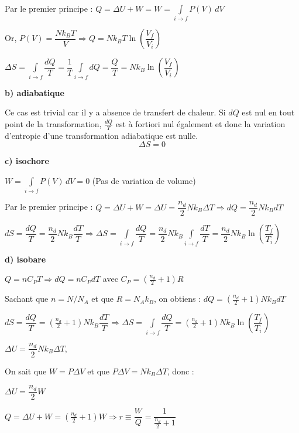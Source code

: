 \documentclass	[11pt, a4paper, openany]{book}
\begin{document}
		Par le premier principe : $ Q = \Delta U + W = W = \int  \limits_{i \to f} P(V)\,dV$
		
		Or, $ P(V) = \dfrac{Nk_BT}{V} \Rightarrow Q = Nk_BT\ln \left(\dfrac{V_f}{V_i}\right)$
		
		$ \Delta S = \int \limits_{i \to f} \dfrac{dQ}{T} = \dfrac{1}{T} \int \limits_{i \to f} dQ = \dfrac{Q}{T} = Nk_B\ln \left(\dfrac{V_f}{V_i}\right)$
	
	\textbf{b) adiabatique}
		
		Ce cas est trivial car il y a absence de transfert de chaleur. Si $dQ$ est nul en tout point de la transformation, $\frac{dQ}{T}$ est à fortiori nul également et donc la variation d'entropie d'une transformation adiabatique est nulle. $$\Delta S = 0$$
		
	\textbf{c) isochore}
	
		$W = \int  \limits_{i \to f} P(V)\,dV = 0$ (Pas de variation de volume)
		
		Par le premier principe : $ Q = \Delta U + W = \Delta U = \dfrac{n_d}{2}Nk_B\Delta T \Rightarrow dQ = \dfrac{n_d}{2}Nk_BdT $
		
		$ dS = \dfrac{dQ}{T} = \dfrac{n_d}{2}Nk_B\dfrac{dT}{T} \Rightarrow \Delta S = \int \limits_{i \to f} \dfrac{dQ}{T} = \dfrac{n_d}{2}Nk_B \int \limits_{i \to f} \dfrac{dT}{T} = \dfrac{n_d}{2}Nk_B\ln \left(\dfrac{T_f}{T_i}\right)$
		
	\textbf{d) isobare}
		
		$ Q = nC_PT \Rightarrow dQ = nC_PdT$ avec $ C_P = (\frac{n_d}{2}+1)R$
		
		Sachant que $n = N/N_A$ et que $R = N_Ak_B$, on obtiens : $dQ = (\frac{n_d}{2}+1)Nk_BdT $
		
		$dS = \dfrac{dQ}{T} = (\frac{n_d}{2}+1)Nk_B\dfrac{dT}{T} \Rightarrow \Delta S = \int \limits_{i \to f} \dfrac{dQ}{T} = (\frac{n_d}{2}+1)Nk_B\ln \left(\dfrac{T_f}{T_i}\right)$

\vspace{0,5cm}

		
		$\Delta U = \dfrac{n_d}{2}Nk_B\Delta T $,
		
		On sait que $W = P\Delta V$ et que $ P\Delta V = Nk_B\Delta T$, donc :
		
		$ \Delta U = \dfrac{n_d}{2}W$
		
		$Q = \Delta U + W = (\frac{n_d}{2}+1)W \Rightarrow r \equiv \dfrac{W}{Q} = \dfrac{1}{\frac{n_d}{2}+1}$
		
\end{document}
